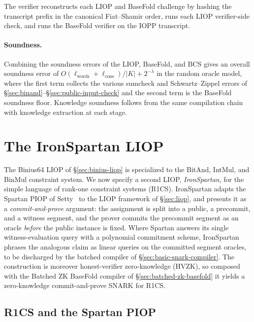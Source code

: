 \documentclass{article}
\theoremstyle{definition}
\begin{document}
The verifier reconstructs each LIOP and BaseFold challenge by hashing the transcript prefix in the canonical Fiat--Shamir order, runs each LIOP verifier-side check, and runs the BaseFold verifier on the IOPP transcript.

\paragraph{Soundness.}
Combining the soundness errors of the LIOP, BaseFold, and BCS gives an overall soundness error of $O\!\left( \ell_\text{words} + \ell_\text{cons} \right) / |K| + 2^{-\lambda}$ in the random oracle model, where the first term collects the various sumcheck and Schwartz--Zippel errors of \S\ref{sec:binand}--\S\ref{sec:public-input-check} and the second term is the BaseFold soundness floor. Knowledge soundness follows from the same compilation chain with knowledge extraction at each stage.

\section{The IronSpartan LIOP}
\label{sec:ironspartan}

The Binius64 LIOP of \S\ref{sec:binius-liop} is specialized to the BitAnd, IntMul, and BinMul constraint system. We now specify a second LIOP, \emph{IronSpartan}, for the simple language of rank-one constraint systems (R1CS). IronSpartan adapts the Spartan PIOP of Setty~\cite{Setty:2020aa} to the LIOP framework of \S\ref{sec:liop}, and presents it as a \emph{commit-and-prove} argument: the assignment is split into a public, a precommit, and a witness segment, and the prover commits the precommit segment as an oracle \emph{before} the public instance is fixed. Where Spartan answers its single witness-evaluation query with a polynomial commitment scheme, IronSpartan phrases the analogous claim as linear queries on the committed segment oracles, to be discharged by the batched compiler of \S\ref{sec:basic-snark-compiler}. The construction is moreover honest-verifier zero-knowledge (HVZK), so composed with the Batched ZK BaseFold compiler of \S\ref{sec:batched-zk-basefold} it yields a zero-knowledge commit-and-prove SNARK for R1CS.

\subsection{R1CS and the Spartan PIOP}
\label{sec:r1cs-spartan}
\end{document}
